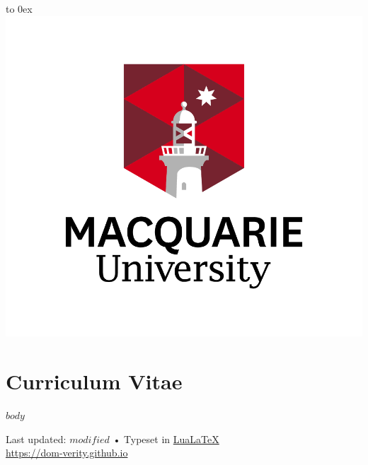 \documentclass[10pt, a4paper]{article}
\begin{document}
\begin{flushright}%
    \vbox to 0ex{\includegraphics[scale=0.6]{images/newmulogo.png}\vss}%
\end{flushright}%

\section{Curriculum Vitae}

$body$

\begin{center}
  {\scriptsize Last updated: $modified$ •
  Typeset in \href{http://nitens.org/taraborelli/cvtex}{
  Lua\LaTeX}\\
  \url{https://dom-verity.github.io}
  }
\end{center}
\end{document}
